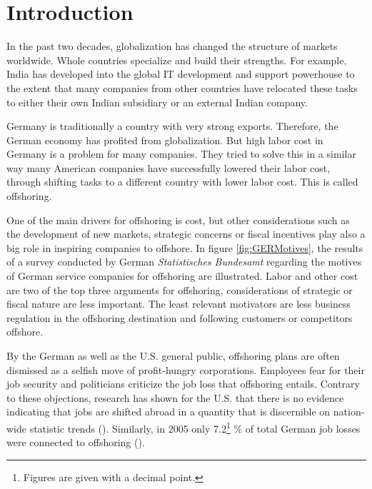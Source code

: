 \section{Introduction}
\label{sec:Intro}
In the past two decades, globalization has changed the structure of markets worldwide. Whole countries specialize and build their strengths. For example, India has developed into the global IT development and support powerhouse to the extent that many companies from other countries have relocated these tasks to either their own Indian subsidiary or an external Indian company.

Germany is traditionally a country with very strong exports. Therefore, the German economy has profited from globalization. But high labor cost in Germany is a problem for many companies. They tried to solve this in a similar way many American companies have successfully lowered their labor cost, through shifting tasks to a different country with lower labor cost. This is called offshoring.

One of the main drivers for offshoring is cost, but other considerations such as the development of new markets, strategic concerns or fiscal incentives play also a big role in inspiring companies to offshore. In figure \ref{fig:GERMotives}, the results of a survey conducted by German \textit{Statistisches Bundesamt} regarding the motives of German service companies for offshoring are illustrated. Labor and other cost are two of the top three arguments for offshoring, considerations of strategic or fiscal nature are less important. The least relevant motivators are less business regulation in the offshoring destination and following customers or competitors offshore.

\vspace{5mm}


By the German as well as the U.S. general public, offshoring plans are often dismissed as a selfish move of profit-hungry corporations. Employees fear for their job security and politicians criticize the job loss that offshoring entails. Contrary to these objections, research has shown for the U.S. that there is no evidence indicating that jobs are shifted abroad in a quantity that is discernible on nation-wide statistic trends (\cite[p. 7]{Jackson.2013}). Similarly, in 2005 only 7.2\footnote{Figures are given with a decimal point.} \% of total German job losses were connected to offshoring (\cite[p. 30]{Gorg.2011}).

